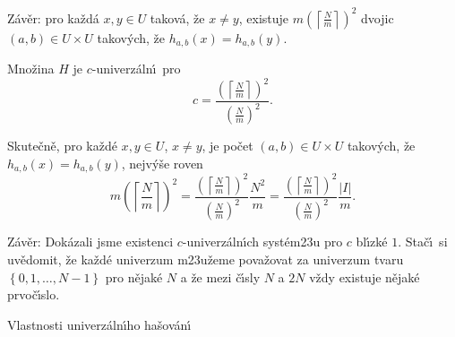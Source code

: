 \flushpar Z\'av\v er: pro ka\v zd\'a $x,y\in U$ takov\'a, \v ze 
$x\ne y$, existuje $m\left(\left\lceil\frac Nm\right\rceil\right)^2$ dvojic $\left(a
,b\right)\in U\times U$ takov\'ych, \v ze 
$h_{a,b}\left(x\right)=h_{a,b}\left(y\right)$.
\medskip

Mno\v zina $H$ je $c$-univerz\'aln\'\i\ pro 
$$c=\frac {\left(\left\lceil\frac Nm\right\rceil\right)^2}{\left(\frac Nm\right)^2}
.$$
\endproclaim

\flushpar Skute\v cn\v e, pro ka\v zd\'e $x,y\in U$, $x\ne y$, je po\v cet 
$\left(a,b\right)\in U\times U$ takov\'ych, \v ze $h_{a,b}\left(x\right)=h_{a,b}\left(y\right)$, nejv\'y\v se roven
$$m\left(\left\lceil\frac Nm\right\rceil\right)^2=\frac {\left(\left\lceil\frac Nm\right\rceil
\right)^2}{\left(\frac Nm\right)^2}\frac {N^2}m=\frac {\left(\left\lceil\frac Nm
\right\rceil\right)^2}{\left(\frac Nm\right)^2}\frac {|I|}m.$$
\medskip

\flushpar Z\'av\v er: Dok\'azali jsme existenci $c$-univerz\'aln\'\i ch 
syst\'em\accent23u pro $c$ bl\'\i zk\'e $1$. Sta\v c\'\i\ si uv\v edomit, \v ze  ka\v zd\'e univerzum m\accent23u\v zeme 
pova\v zovat za univerzum tvaru $\left\{0,1,\dots,N-1\right\}$ pro n\v ejak\'e 
$N$ a \v ze mezi \v c\'\i sly $N$ a $2N$ v\v zdy existuje n\v ejak\'e 
prvo\v c\'\i slo.
\medskip

\subhead
Vlastnosti univerz\'aln\'\i ho ha\v sov\'an\'\i
\endsubhead
\smallskip


